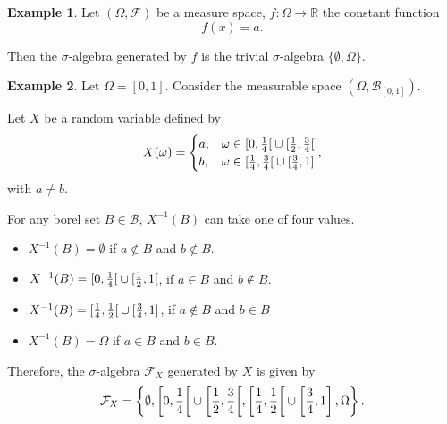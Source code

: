\documentclass[a4paper,12pt]{scrreprt}
\newcommand{\R}{\mathbb{R}}
\theoremstyle{definition}
\newtheorem{example}{Example}[section]
\theoremstyle{plain}
\theoremstyle{remark}
\begin{document}
\begin{example}
  Let $(\Omega, \mathcal{F})$ be a measure space, $f\colon \Omega \to \R$ the constant function
  \begin{equation*}
    f(x) = a.
  \end{equation*}

  Then the $\sigma$-algebra generated by $f$ is the trivial $\sigma$-algebra $\{\emptyset, \Omega\}$.
\end{example}

\begin{example}
  \label{eg:sigmaalgebrageneratedbytwovaluedfunction}
  Let $\Omega = [0, 1]$. Consider the measurable space $(\Omega, \mathcal{B}_{[0, 1]})$.

  Let $X$ be a random variable defined by
  \begin{equation*}
    X(\omega) =
    \begin{cases}
      a, &\omega \in \interval[open right]{0}{\frac{1}{4}} \cup \interval[open right]{\frac{1}{2}}{\frac{3}{4}} \\
      b, &\omega \in \interval[open right]{\frac{1}{4}}{\frac{3}{4}} \cup \interval{\frac{3}{4}}{1}
    \end{cases},
  \end{equation*}
  with $a \neq b$.

  For any borel set $B \in \mathcal{B}$, $X^{-1}(B)$ can take one of four values.
  \begin{itemize}
    \item $X^{-1}(B) = \emptyset$ if $a \notin B$ and $b \notin B$.

    \item $X^{-1}(B) = \interval[open right]{0}{\frac{1}{4}} \cup \interval[open right]{\frac{1}{2}}{1}$, if $a \in B$ and $b \notin B$.

    \item $X^{-1}(B) = \interval[open right]{\frac{1}{4}}{\frac{1}{2}} \cup \interval{\frac{3}{4}}{1}$, if $a \notin B$ and $b \in B$

    \item $X^{-1}(B) = \Omega$ if $a \in B$ and $b \in B$.
  \end{itemize}

  Therefore, the $\sigma$-algebra $\mathcal{F}_{X}$ generated by $X$ is given by
  \begin{equation*}
    \mathcal{F}_{X} = \left\{ \emptyset, \interval[open right, scaled]{0}{\frac{1}{4}} \cup \interval[open right, scaled]{\frac{1}{2}}{\frac{3}{4}}, \interval[open right, scaled]{\frac{1}{4}}{\frac{1}{2}} \cup \left[\frac{3}{4}, 1\right], \Omega \right\}.
  \end{equation*}
\end{example}
\end{document}
